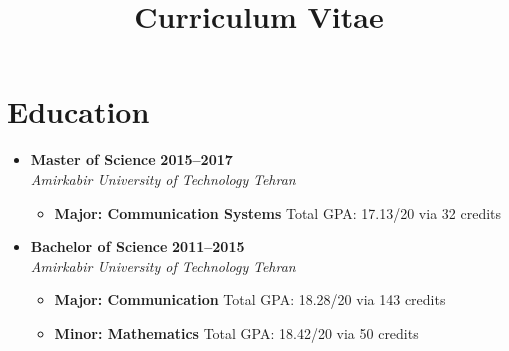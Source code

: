 \documentclass[10pt,a4paper,sans]{moderncv} %
\title{Curriculum Vitae}
\begin{document}
\makecvtitle



\section{Education}
\begin{itemize}
\item \textbf{Master of Science} \hfill \textbf{2015--2017 } \\
\emph{Amirkabir University of Technology} \hfill \emph{Tehran}
\begin{itemize}
\item \textbf{Major: Communication Systems}\hspace{10 pt} Total GPA: 17.13/20 via 32 credits
\end{itemize}

\item \textbf{Bachelor of Science} \hfill \textbf{2011--2015} \\
\emph{Amirkabir University of Technology} \hfill \emph{Tehran}

\begin{itemize}
\item \textbf{Major: Communication} \hspace{10 pt} Total GPA: 18.28/20 via 143 credits
\item \textbf{Minor: Mathematics} \hspace{36 pt}  Total GPA: 18.42/20  via 50 credits 
\end{itemize}


\end{itemize}
\end{document}
